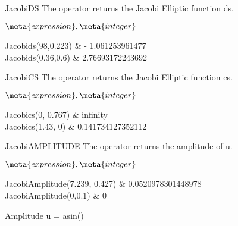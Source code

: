 \begin{Operator}{JacobiDS}
The  operator returns the Jacobi Elliptic function ds.

\begin{Syntax}
\(\meta{expression},\meta{integer}\)
\end{Syntax}

\begin{Examples}
Jacobids(98,0.223)       & - 1.061253961477 \\
Jacobids(0.36,0.6)       & 2.76693172243692 \\
\end{Examples}

\end{Operator}

\begin{Operator}{JacobiCS}
The  operator returns the Jacobi Elliptic function cs.

\begin{Syntax}
\(\meta{expression},\meta{integer}\)
\end{Syntax}

\begin{Examples}
Jacobics(0, 0.767)       & infinity   \\
Jacobics(1.43, 0)        & 0.141734127352112 \\
\end{Examples}

\end{Operator}

\begin{Operator}{JacobiAMPLITUDE}
The  operator returns the amplitude of u.
\begin{Syntax}
\(\meta{expression},\meta{integer}\)
\end{Syntax}

\begin{Examples}
JacobiAmplitude(7.239, 0.427)  & 0.0520978301448978 \\
JacobiAmplitude(0,0.1)         & 0 \\
\end{Examples}

\begin{Comments}
Amplitude u = asin()
\end{Comments}
\end{Operator}


